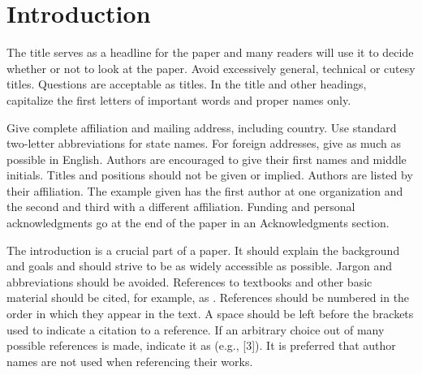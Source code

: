 \documentclass{article}
\begin{document}

\section{Introduction}
\label{intro}

The title serves as a headline for the paper and many readers will use it to decide whether or not to look at the paper. Avoid excessively general,
technical or cutesy titles. Questions are acceptable as titles. In the title and other headings, capitalize the first letters of important words
and proper names only. 

Give complete affiliation and mailing address, including country. Use standard two-letter abbreviations for state names. For foreign addresses, give
as much as possible in English. Authors are encouraged to give their first names and middle initials. Titles and positions should not be given or
implied. Authors are listed by their affiliation. The example given has the first author at one organization and the second and third with a different
affiliation. Funding and personal acknowledgments go at the end of the paper in an Acknowledgments section. 

\break

The introduction is a crucial part of a paper. It should explain the background and goals and should strive to be as widely accessible
as possible. Jargon and abbreviations should be avoided. References to textbooks and other basic material should be cited, for example, as \cite{a-review,text-a,text-b}. 
References should be numbered in the order in which they appear in the text. A space should be left before the brackets used to indicate a citation
to a reference. If an arbitrary choice out of many possible references is made, indicate it as (e.g., [3]). It is preferred that author names are
not used when referencing their works. 
\end{document}
